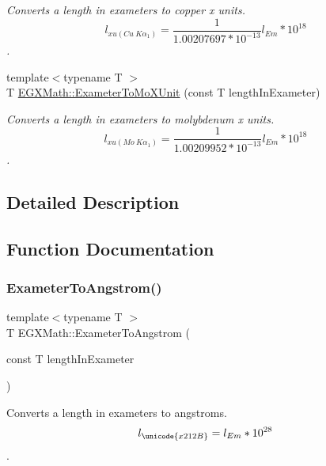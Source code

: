 \begin{DoxyCompactItemize}
\begin{DoxyCompactList}\small\item\em Converts a length in exameters to copper x units. \[ l_{xu(Cu\ K\alpha_1)}= \frac{1}{1.00207697*10^{-13}} l_{Em} * 10^{18}\]. \end{DoxyCompactList}\item 
{\footnotesize template$<$typename T $>$ }\\T \mbox{\hyperlink{group___e_g_x_math-_conversions-_length_conversions-_s_i-_exameter-_non-_s_i_gadf73e46609660df6b7ae77ec7241183e}{E\+G\+X\+Math\+::\+Exameter\+To\+Mo\+X\+Unit}} (const T length\+In\+Exameter)
\begin{DoxyCompactList}\small\item\em Converts a length in exameters to molybdenum x units. \[ l_{xu(Mo\ K\alpha_1)}=\frac{1}{1.00209952*10^{-13}} l_{Em} * 10^{18}\]. \end{DoxyCompactList}\end{DoxyCompactItemize}


\subsection{Detailed Description}


\subsection{Function Documentation}
\mbox{\label{group___e_g_x_math-_conversions-_length_conversions-_s_i-_exameter-_non-_s_i_ga24d2ee057470ce37f99d31451e010a22}} 
\subsubsection{\texorpdfstring{Exameter\+To\+Angstrom()}{ExameterToAngstrom()}}
{\footnotesize\ttfamily template$<$typename T $>$ \\
T E\+G\+X\+Math\+::\+Exameter\+To\+Angstrom (\begin{DoxyParamCaption}\item[{const T}]{length\+In\+Exameter }\end{DoxyParamCaption})}



Converts a length in exameters to angstroms. \[ l_{\unicode{x212B}}=l_{Em} * 10^{28} \]. 


